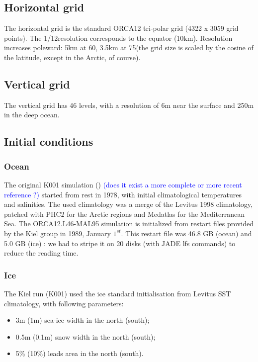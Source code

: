 \documentclass[12pt]{article}
\begin{document}
\subsection{Horizontal grid}

The horizontal grid is the standard ORCA12 tri-polar grid (4322 x 3059 grid points). The 1/12\degres \enspace resolution corresponds to the equator (10km). Resolution increases poleward: 5km at 60\degres, 3.5km at 75\degres \enspace (the grid size is scaled by the cosine of the latitude, except in the Arctic, of course).

\subsection{Vertical grid}

The vertical grid has 46 levels, with a resolution of 6m near the surface and 250m in the deep ocean.

\subsection{Initial conditions}

\subsubsection{Ocean}

The original K001 simulation (\cite{Scheinert}) \textcolor{blue}{(does it exist a more complete or more recent reference ?)} started from rest in 1978, with initial climatological temperatures and salinities. The used climatology was a merge of the Levitus 1998 climatology, patched with PHC2 for the Arctic regions and Medatlas for the Mediterranean Sea. The ORCA12.L46-MAL95 simulation is initialized from restart files provided by the Kiel group in 1989, January $1^{st}$. This restart file was 46.8 GB (ocean) and 5.0 GB (ice) : we had to stripe it on 20 disks (with JADE lfs commands) to reduce the reading time.

\subsubsection{Ice}

The Kiel run (K001) used the ice standard initialisation from Levitus SST climatology, with following parameters:
\begin{itemize}
 \item 3m (1m) sea-ice width in the north (south);
 \item 0.5m (0.1m) snow width in the north (south);
 \item 5\% (10\%) leads area in the north (south).
\end{itemize}
\end{document}

